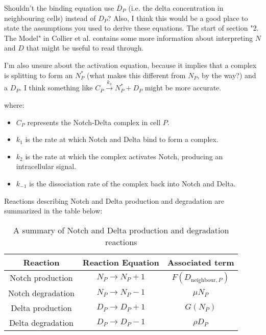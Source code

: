 \documentclass{article}
\begin{document}
Shouldn't the binding equation use $\overline{D}_{P}$ (i.e. the delta concentration in neighbouring cells) instead of $D_{P}$? Also, I think this would be a good place to state the assumptions you used to derive these equations. The start of section "2. The Model" in Collier et al. contains some more information about interpreting $N$ and $D$ that might be useful to read through.

\medskip

I'm also unsure about the activation equation, because it implies that a complex is splitting to form an $N_{P}^{*}$ (what makes this different from $N_{P}$, by the way?) and a $D_{P}$. I think something like $C_{P} \xrightarrow{k_{2}} N_{P}^{*} + D_{P}$ might be more accurate.

\color{black}

\medskip

where:

\begin{itemize}
  \item $C_{P}$ represents the Notch-Delta complex in cell $P$.
  \item $k_1$ is the rate at which Notch and Delta bind to form a complex.
  \item $k_2$ is the rate at which the complex activates Notch, producing an intracellular signal.
  \item $k_{-1}$ is the dissociation rate of the complex back into Notch and Delta.
\end{itemize}

Reactions describing Notch and Delta production and degradation  are summarized in the table below:

\begin{table}[H]
    \centering
    \begin{tabular}{|c|c|c|} \hline 
         Reaction&  Reaction Equation& Associated term\\ \hline 
         Notch production&  \( N_P \to N_P + 1 \)& \( F(D_{\text{neighbour},P}) \)\\ \hline 
         Notch degradation&  \( N_P \to N_P - 1 \)& \( \mu N_P \)\\ \hline 
         Delta production&  \( D_P \to D_P + 1 \)& \( G(N_P) \)\\ \hline 
         Delta degradation&  \( D_P \to D_P - 1 \)& \( \rho D_P \)\\\hline
    \end{tabular}
    \caption{A summary of Notch and Delta production and degradation reactions}
    \label{1}
    
\end{table}
\end{document}
